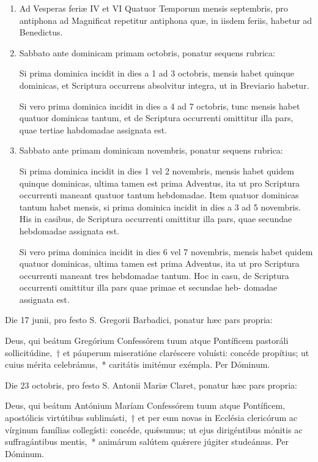 \documentclass[vesperale_romanum.tex]{subfiles}
\begin{document}
\begin{enumerate}[nosep,start=37]
\item Ad Vesperas feriæ IV et VI Quatuor Temporum mensis septembris, pro antiphona ad Magnificat repetitur antiphona quæ, in iisdem feriis, habetur ad Benedictus.


\item Sabbato ante dominicam primam octobris, ponatur sequens rubrica: 

\quad Si prima dominica incidit in dies a 1 ad 3 octobris, mensis habet quinque dominicas, et Scriptura occurrens absolvitur integra, ut in Breviario habetur.

\quad Si vero prima dominica incidit in dies a 4 ad 7 octobris, tunc mensis habet quatuor dominicas tantum, et de Scriptura occurrenti omittitur illa pars, quae tertiae habdomadae assignata est.
%

\item Sabbato ante primam dominicam novembris, ponatur sequens rubrica:

\quad Si prima dominica incidit in dies 1 vel 2 novembris, mensis habet quidem quinque dominicas, ultima tamen est prima Adventus, ita ut pro Scriptura occurrenti maneant quatuor tantum hebdomadae. Item quatuor dominicas tantum habet mensis, si prima dominica incidit in dies a 3 ad 5 novembris. His in casibus, de Scriptura occurrenti omittitur illa pars, quae secundae hebdomadae assignata est. 

\quad Si vero prima dominica incidit in dies 6 vel 7 novembris, mensis habet quidem quatuor dominicas, ultima tamen est prima Adventus, ita ut pro Scriptura occurrenti maneant tres hebdomadae tantum. Hoc in casu, de Scriptura occurrenti omittitur illa pars quae primae et secundae heb- domadae assignata est.


\end{enumerate}

 Die 17 junii, pro festo S. Gregorii Barbadici, ponatur hæc pars propria:
 
\noindent Deus, qui beátum Gregórium Confessórem tuum atque Pontíficem pastoráli sollicitúdine,~† et páuperum miseratióne claréscere voluísti: concéde propítius; ut cuius mérita celebrámus,~* caritátis imitémur exémpla.
Per Dóminum.

Die 23 octobris, pro festo S. Antonii Mariæ Claret, ponatur hæc pars propria:

\noindent Deus, qui beátum Antónium Maríam Confessórem tuum atque Pontíficem, apostólicis virtútibus sublimásti,~† et per eum novas in Ecclésia clericórum ac vírginum famílias collegísti: concéde, quǽsumus; ut ejus dirigéntibus mónitis ac suffragántibus mentis,~* animárum salútem quǽrere júgiter studeámus.
Per Dóminum.
\end{document}
